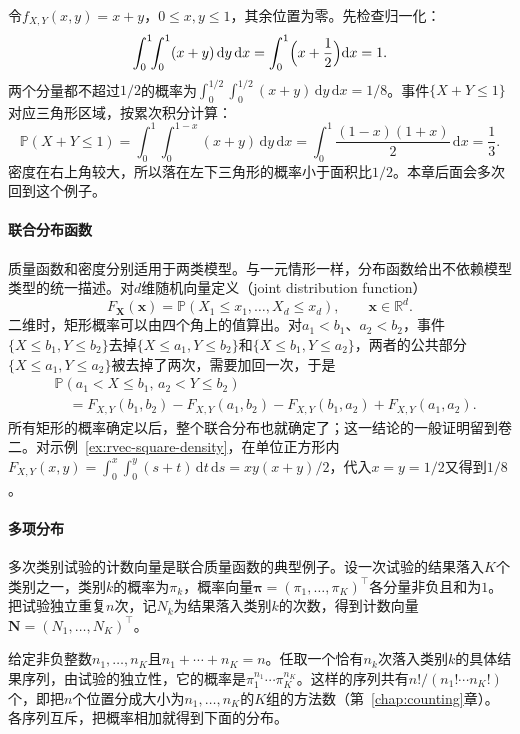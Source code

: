 \begin{example}[正方形上的联合密度]
\label{ex:rvec-square-density}
令$f_{X,Y}(x,y)=x+y$，$0\le x,y\le1$，其余位置为零。先检查归一化：
\[
 \int_0^1\!\!\int_0^1(x+y)\,\mathrm dy\,\mathrm dx=\int_0^1\Bigl(x+\frac12\Bigr)\mathrm dx=1 .
\]
两个分量都不超过$1/2$的概率为$\int_0^{1/2}\!\int_0^{1/2}(x+y)\,\mathrm dy\,\mathrm dx=1/8$。事件$\{X+Y\le1\}$对应三角形区域，按累次积分计算：
\[
 \mathbb P(X+Y\le1)=\int_0^1\!\!\int_0^{1-x}(x+y)\,\mathrm dy\,\mathrm dx
 =\int_0^1\frac{(1-x)(1+x)}2\,\mathrm dx=\frac13 .
\]
密度在右上角较大，所以落在左下三角形的概率小于面积比$1/2$。本章后面会多次回到这个例子。
\end{example}

\paragraph{联合分布函数}
质量函数和密度分别适用于两类模型。与一元情形一样，分布函数给出不依赖模型类型的统一描述。对$d$维随机向量定义（joint distribution function）
\[
 F_{\bm X}(\bm x)=\mathbb P(X_1\le x_1,\ldots,X_d\le x_d),\qquad \bm x\in\mathbb R^d .
\]
二维时，矩形概率可以由四个角上的值算出。对$a_1<b_1$、$a_2<b_2$，事件$\{X\le b_1,Y\le b_2\}$去掉$\{X\le a_1,Y\le b_2\}$和$\{X\le b_1,Y\le a_2\}$，两者的公共部分$\{X\le a_1,Y\le a_2\}$被去掉了两次，需要加回一次，于是
\[
\begin{aligned}
 &\mathbb P(a_1<X\le b_1,\,a_2<Y\le b_2)\\
 &\quad=F_{X,Y}(b_1,b_2)-F_{X,Y}(a_1,b_2)-F_{X,Y}(b_1,a_2)+F_{X,Y}(a_1,a_2).
\end{aligned}
\]
所有矩形的概率确定以后，整个联合分布也就确定了；这一结论的一般证明留到卷二。对示例~\ref{ex:rvec-square-density}，在单位正方形内
$F_{X,Y}(x,y)=\int_0^x\!\int_0^y(s+t)\,\mathrm dt\,\mathrm ds=xy(x+y)/2$，代入$x=y=1/2$又得到$1/8$。

\paragraph{多项分布}
多次类别试验的计数向量是联合质量函数的典型例子。设一次试验的结果落入$K$个类别之一，类别$k$的概率为$\pi_k$，概率向量$\bm\pi=(\pi_1,\ldots,\pi_K)^{\top}$各分量非负且和为$1$。把试验独立重复$n$次，记$N_k$为结果落入类别$k$的次数，得到计数向量$\bm N=(N_1,\ldots,N_K)^{\top}$。

给定非负整数$n_1,\ldots,n_K$且$n_1+\cdots+n_K=n$。任取一个恰有$n_k$次落入类别$k$的具体结果序列，由试验的独立性，它的概率是$\pi_1^{n_1}\cdots\pi_K^{n_K}$。这样的序列共有$n!/(n_1!\cdots n_K!)$个，即把$n$个位置分成大小为$n_1,\ldots,n_K$的$K$组的方法数（第~\ref{chap:counting}章）。各序列互斥，把概率相加就得到下面的分布。

